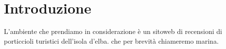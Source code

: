 \section{Introduzione}

L'ambiente che prendiamo in considerazione è un sitoweb di recensioni di porticcioli turistici dell'isola d'elba. che per brevità chiameremo marina.